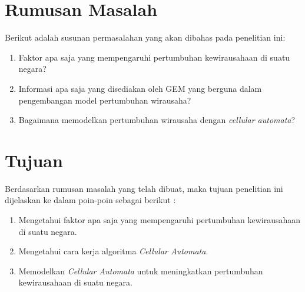 \section{Rumusan Masalah}
\label{sec:rumusan}
Berikut adalah susunan permasalahan yang akan dibahas pada penelitian ini:


\begin{enumerate}
	\item Faktor apa saja yang mempengaruhi pertumbuhan kewirausahaan di suatu negara?
	\item Informasi apa saja yang disediakan oleh GEM yang berguna dalam pengembangan model pertumbuhan wirausaha?
	\item Bagaimana memodelkan pertumbuhan wirausaha dengan \textit{cellular automata}?
\end{enumerate}



\section{Tujuan}
\label{sec:tujuan}
Berdasarkan rumusan masalah yang telah dibuat, maka tujuan penelitian ini dijelaskan ke dalam poin-poin sebagai berikut :


\begin{enumerate}
	\item Mengetahui faktor apa saja yang mempengaruhi pertumbuhan kewirausahaan di suatu negara.
	\item Mengetahui cara kerja algoritma \textit{Cellular Automata}.
	\item Memodelkan \textit{Cellular Automata} untuk meningkatkan pertumbuhan kewirausahaan di suatu negara.
\end{enumerate}



